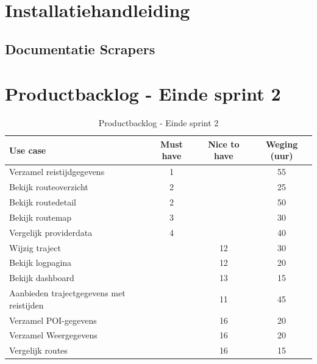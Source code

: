 \documentclass[a4paper]{article}
\begin{document}
\section{Installatiehandleiding}
\label{sec:installatiehandleiding}


\newpage

\subsection{Documentatie Scrapers}


\newpage


\section{Productbacklog - Einde sprint 2}



\begin{table}[H]
\centering
\begin{tabular}{|l|c|c|c|} 
\hline
\textbf{Use case} & \textbf{Must have} & \textbf{Nice to have}  & \textbf{Weging (uur)}\\ \hline \hline
Verzamel reistijdgegevens & 1 & & 55 \\ \hline 
Bekijk routeoverzicht & 2 & & 25 \\ \hline 
Bekijk routedetail & 2 & & 50 \\ \hline 
Bekijk routemap & 3 & & 30 \\ \hline 
Vergelijk providerdata & 4 & & 40 \\ \hline
Wijzig traject & & 12 & 30 \\ \hline
Bekijk logpagina & & 12 & 20 \\ \hline 
Bekijk dashboard & & 13 & 15 \\ \hline 
Aanbieden trajectgegevens met reistijden & & 11 & 45 \\ \hline
Verzamel POI-gegevens & & 16 & 20 \\ \hline
Verzamel Weergegevens & & 16 & 20 \\ \hline
Vergelijk routes & & 16 & 15 \\ \hline
\end{tabular}
\caption{Productbacklog - Einde sprint 2\label{productbacklog}}
\end{table}
\end{document}
